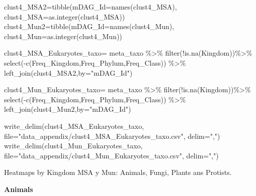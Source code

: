 \documentclass[
  letterpaper,
  DIV=11,
  numbers=noendperiod]{scrreprt}
\newenvironment{Shaded}{}{}
\newcommand{\AttributeTok}[1]{\textcolor[rgb]{0.78,0.47,0.87}{#1}}
\newcommand{\FunctionTok}[1]{\textcolor[rgb]{0.38,0.69,0.94}{#1}}
\newcommand{\NormalTok}[1]{\textcolor[rgb]{0.67,0.70,0.75}{#1}}
\newcommand{\OtherTok}[1]{\textcolor[rgb]{0.15,0.68,0.38}{#1}}
\newcommand{\SpecialCharTok}[1]{\textcolor[rgb]{0.34,0.71,0.76}{#1}}
\newcommand{\StringTok}[1]{\textcolor[rgb]{0.60,0.76,0.47}{#1}}
\begin{document}
\begin{Shaded}
\begin{Highlighting}[]
\NormalTok{clust4\_MSA2}\OtherTok{=}\FunctionTok{tibble}\NormalTok{(}\AttributeTok{mDAG\_Id=}\FunctionTok{names}\NormalTok{(clust4\_MSA),}
                      \AttributeTok{clust4\_MSA=}\FunctionTok{as.integer}\NormalTok{(clust4\_MSA))}
\NormalTok{clust4\_Mun2}\OtherTok{=}\FunctionTok{tibble}\NormalTok{(}\AttributeTok{mDAG\_Id=}\FunctionTok{names}\NormalTok{(clust4\_Mun),}
                      \AttributeTok{clust4\_Mun=}\FunctionTok{as.integer}\NormalTok{(clust4\_Mun))}

\NormalTok{clust4\_MSA\_Eukaryotes\_taxo}\OtherTok{=}\NormalTok{ meta\_taxo }\SpecialCharTok{\%\textgreater{}\%} \FunctionTok{filter}\NormalTok{(}\SpecialCharTok{!}\FunctionTok{is.na}\NormalTok{(Kingdom))}\SpecialCharTok{\%\textgreater{}\%}
  \FunctionTok{select}\NormalTok{(}\SpecialCharTok{{-}}\FunctionTok{c}\NormalTok{(Freq\_Kingdom,Freq\_Phylum,Freq\_Class)) }\SpecialCharTok{\%\textgreater{}\%}
  \FunctionTok{left\_join}\NormalTok{(clust4\_MSA2,}\AttributeTok{by=}\StringTok{"mDAG\_Id"}\NormalTok{)}
  
\NormalTok{clust4\_Mun\_Eukaryotes\_taxo}\OtherTok{=}\NormalTok{ meta\_taxo }\SpecialCharTok{\%\textgreater{}\%} \FunctionTok{filter}\NormalTok{(}\SpecialCharTok{!}\FunctionTok{is.na}\NormalTok{(Kingdom))}\SpecialCharTok{\%\textgreater{}\%}
  \FunctionTok{select}\NormalTok{(}\SpecialCharTok{{-}}\FunctionTok{c}\NormalTok{(Freq\_Kingdom,Freq\_Phylum,Freq\_Class)) }\SpecialCharTok{\%\textgreater{}\%}
  \FunctionTok{left\_join}\NormalTok{(clust4\_Mun2,}\AttributeTok{by=}\StringTok{"mDAG\_Id"}\NormalTok{)}
  



\FunctionTok{write\_delim}\NormalTok{(clust4\_MSA\_Eukaryotes\_taxo,}
                        \AttributeTok{file=}\StringTok{"data\_appendix/clust4\_MSA\_Eukaryotes\_taxo.csv"}\NormalTok{,}
                        \AttributeTok{delim=}\StringTok{","}\NormalTok{)}
\FunctionTok{write\_delim}\NormalTok{(clust4\_Mun\_Eukaryotes\_taxo,}
                        \AttributeTok{file=}\StringTok{"data\_appendix/clust4\_Mun\_Eukaryotes\_taxo.csv"}\NormalTok{,}
                        \AttributeTok{delim=}\StringTok{","}\NormalTok{)}
\end{Highlighting}
\end{Shaded}

Heatmaps by Kingdom MSA y Mun: Animals, Fungi, Plants ans Protists.

\textbf{Animals}
\end{document}
